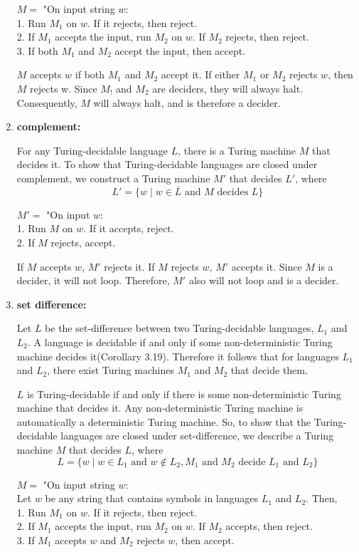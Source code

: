 \documentclass{article}
\begin{document}
\begin{enumerate}[\indent a)]
$M = $ "On input string $w$: 
    \\1. Run $M_1$ on $w$. If it rejects, then reject.
    \\2. If $M_1$ accepts the input, run $M_2$ on $w$. If $M_2$ rejects, then reject.
    \\3. If both $M_1$ and $M_2$ accept the input, then accept.
    
    
    $M$ accepts $w$ if both $M_1$ and $M_2$ accept it. If either $M_1$ or $M_2$ rejects $w$, then $M$ rejects w. Since $M_!$ and $M_2$ are deciders, they will always halt. Consequently, $M$ will always halt, and is therefore a decider.
    
    \item \textbf{complement:}
    
    For any Turing-decidable language $L$, there is a Turing machine $M$ that decides it. To show that Turing-decidable languages are closed under complement, we construct a Turing machine $M'$ that decides $L'$, where
    $$L' = \{w \;|\;  w \in \overline{L} \text{ and $M$ decides $L$}  \}$$
    
    $M' = $ "On input $w$:
    \\1. Run $M$ on $w$. If it accepts, reject.
    \\2. If $M$ rejects, accept.
    
    
    If $M$ accepts $w$, $M'$ rejects it. If $M$ rejects $w$, $M'$ accepts it. Since $M$ is a decider, it will not loop. Therefore, $M'$ also will not loop and is a decider.
    \item \textbf{set difference:}
    
        Let $L$ be the set-difference between two Turing-decidable languages, $L_1$ and $L_2$. A language is decidable if and only if some non-deterministic Turing machine decides it(Corollary 3.19). Therefore it follows that for languages $L_1$ and $L_2$, there exist Turing machines $M_1$ and $M_2$ that decide them.

$L$ is Turing-decidable if and only if there is some non-deterministic Turing machine that decides it. Any non-deterministic Turing machine is automatically a deterministic Turing machine. So, to show that the Turing-decidable languages are closed under set-difference, we describe a Turing machine $M$ that decides $L$, where
$$L = \{w \;|\;  w \in L_1 \text{ and } w\notin L_2, M_1 \text{ and  $M_2$ decide $L_1$ and $L_2$}\}$$

$M = $ "On input string $w$: 
    \\Let $w$ be any string that contains symbols in languages $L_1$ and $L_2$. Then,
    \\1. Run $M_1$ on $w$. If it rejects, then reject.
    \\2. If $M_1$ accepts the input, run $M_2$ on $w$. If $M_2$ accepts, then reject.
    \\3. If $M_1$ accepts $w$ and $M_2$ rejects $w$, then accept.
    

\end{enumerate}
\end{document}

